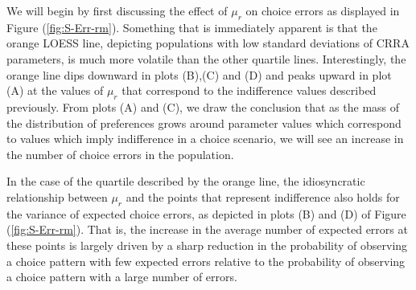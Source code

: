 \documentclass[../main.tex]{subfiles}
\begin{document}
We will begin by first discussing the effect of $\mu_r$ on choice errors as displayed in Figure (\ref{fig:S-Err-rm}).
Something that is immediately apparent is that the orange LOESS line, depicting populations with low standard deviations of CRRA parameters, is much more volatile than the other quartile lines.
Interestingly, the orange line dips downward in plots (B),(C) and (D) and peaks upward in plot (A) at the values of $\mu_r$ that correspond to the indifference values described previously.
From plots (A) and (C), we draw the conclusion that as the mass of the distribution of preferences grows around parameter values which correspond to values which imply indifference in a choice scenario, we will see an increase in the number of choice errors in the population.

In the case of the quartile described by the orange line, the idiosyncratic relationship between $\mu_r$ and the points that represent indifference also holds for the variance of expected choice errors, as depicted in plots (B) and (D) of Figure (\ref{fig:S-Err-rm}).
That is, the increase in the average number of expected errors at these points is largely driven by a sharp reduction in the probability of observing a choice pattern with few expected errors relative to the probability of observing a choice pattern with a large number of errors.{\footnotemark}

\addtocounter{footnote}{-1}
\end{document}
